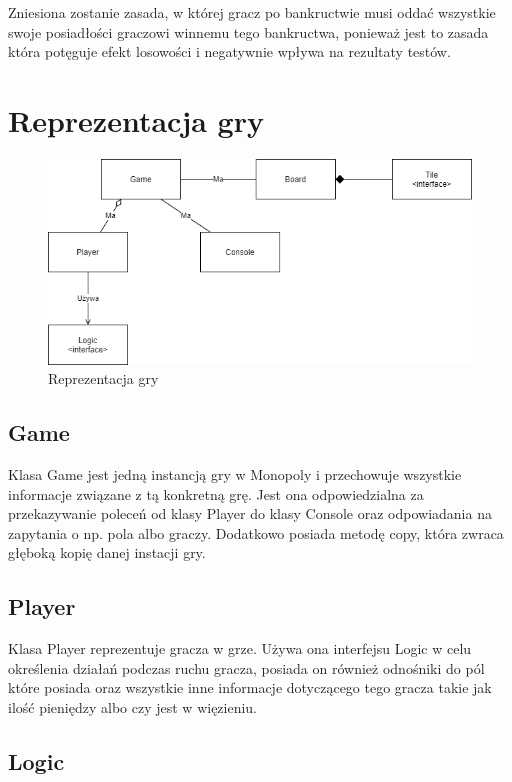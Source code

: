 \documentclass{article}
\begin{document}
Zniesiona zostanie zasada, w której gracz po bankructwie musi oddać wszystkie swoje posiadłości graczowi winnemu tego bankructwa, ponieważ jest to zasada która potęguje efekt losowości i negatywnie wpływa na rezultaty testów.

\section{Reprezentacja gry}

\begin{figure}
	\includegraphics[width=\textwidth]{gra}
	\caption{Reprezentacja gry}
\end{figure}

\subsection{Game}

Klasa Game jest jedną instancją gry w Monopoly i przechowuje wszystkie informacje związane z tą konkretną grę. Jest ona odpowiedzialna za przekazywanie poleceń od klasy Player do klasy Console oraz odpowiadania na zapytania o np. pola albo graczy. Dodatkowo posiada metodę copy, która zwraca głęboką kopię danej instacji gry.

\subsection{Player}

Klasa Player reprezentuje gracza w grze. Używa ona interfejsu Logic w celu określenia działań podczas ruchu gracza, posiada on również odnośniki do pól które posiada oraz wszystkie inne informacje dotyczącego tego gracza takie jak ilość pieniędzy albo czy jest w więzieniu.

\subsection{Logic}
\end{document}
